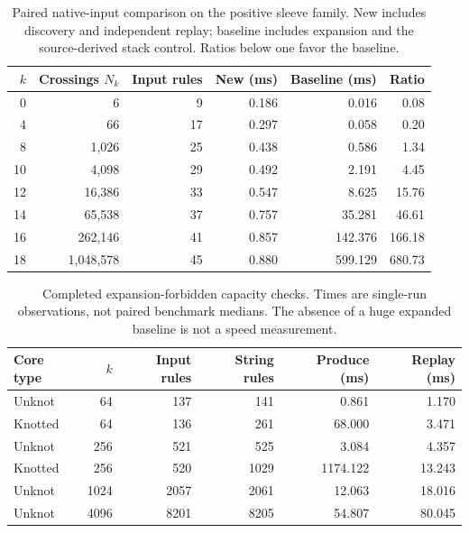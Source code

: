 \documentclass[11pt,letterpaper]{article}
\theoremstyle{definition}\newtheorem{definition}[theorem]{Definition}
\theoremstyle{remark}\newtheorem{remark}[theorem]{Remark}
\begin{document}
\begin{table}[htbp]
\centering\small
\begin{tabular}{@{}rrrrrr@{}}
\toprule
$k$ & Crossings $N_k$ & Input rules & New (ms) & Baseline (ms) & Ratio\\
\midrule
0 & 6 & 9 & 0.186 & 0.016 & 0.08\\
4 & 66 & 17 & 0.297 & 0.058 & 0.20\\
8 & 1,026 & 25 & 0.438 & 0.586 & 1.34\\
10 & 4,098 & 29 & 0.492 & 2.191 & 4.45\\
12 & 16,386 & 33 & 0.547 & 8.625 & 15.76\\
14 & 65,538 & 37 & 0.757 & 35.281 & 46.61\\
16 & 262,146 & 41 & 0.857 & 142.376 & 166.18\\
18 & 1,048,578 & 45 & 0.880 & 599.129 & 680.73\\
\bottomrule
\end{tabular}
\caption{Paired native-input comparison on the positive sleeve family. New includes discovery and independent replay; baseline includes expansion and the source-derived stack control. Ratios below one favor the baseline.}
\label{tab:benchmark}
\end{table}

\begin{table}[htbp]
\centering\small
\begin{tabular}{@{}lrrrrr@{}}
\toprule
Core type & $k$ & Input rules & String rules & Produce (ms) & Replay (ms)\\
\midrule
Unknot & 64 & 137 & 141 & 0.861 & 1.170\\
Knotted & 64 & 136 & 261 & 68.000 & 3.471\\
Unknot & 256 & 521 & 525 & 3.084 & 4.357\\
Knotted & 256 & 520 & 1029 & 1174.122 & 13.243\\
Unknot & 1024 & 2057 & 2061 & 12.063 & 18.016\\
Unknot & 4096 & 8201 & 8205 & 54.807 & 80.045\\
\bottomrule
\end{tabular}
\caption{Completed expansion-forbidden capacity checks. Times are single-run observations, not paired benchmark medians. The absence of a huge expanded baseline is not a speed measurement.}
\label{tab:capacity}
\end{table}
\end{document}
